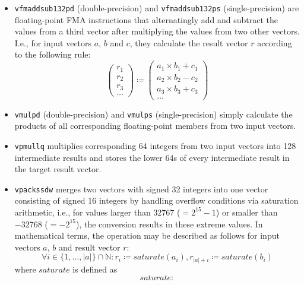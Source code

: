 \begin{itemize}
	\item \texttt{vfmaddsub132pd} (double-precision) and \texttt{vfmaddsub132ps} (single-precision) are floating-point \gls{FMA} instructions that alternatingly add and subtract the values from a third vector after multiplying the values from two other vectors. I.e., for input vectors $a$, $b$ and $c$, they calculate the result vector $r$ according to the following rule:
	\begin{displaymath}
		\begin{pmatrix}
		r_1 \\
		r_2 \\
		r_3 \\
		\dots
		\end{pmatrix}
		\coloneqq
		\begin{pmatrix}
		a_1 \times b_1 + c_1 \\
		a_2 \times b_2 - c_2 \\
		a_3 \times b_3 + c_3 \\
		\dots
		\end{pmatrix}
	\end{displaymath}
	\item \texttt{vmulpd} (double-precision) and \texttt{vmulps} (single-precision) simply calculate the products of all corresponding floating-point members from two input vectors.
	\item \texttt{vpmullq} multiplies corresponding \SI[number-unit-product=-]{64}{\bit} integers from two input vectors into \SI[number-unit-product=-]{128}{\bit} intermediate results and stores the lower \SI{64}{\bit}s of every intermediate result in the target result vector.
	\item \texttt{vpackssdw} merges two vectors with signed \SI[number-unit-product=-]{32}{\bit} integers into one vector consisting of signed \SI[number-unit-product=-]{16}{\bit} integers by handling overflow conditions via saturation arithmetic, i.e., for values larger than $32767$ ($=2^{15}-1$) or smaller than $-32768$ ($=-2^{15}$), the conversion results in these extreme values. In mathematical terms, the operation may be described as follows for input vectors $a$, $b$ and result vector $r$:
		\begin{displaymath}
		\forall i \in \{1,\dots,|a|\} \cap \mathbb{N}\colon r_i \coloneqq saturate(a_i), r_{|a|+i} \coloneqq saturate(b_i)
		\end{displaymath}
		where $saturate$ is defined as
		\begin{displaymath}
		saturate\colon

\end{displaymath}
\end{itemize}

